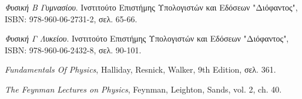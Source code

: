 \documentclass[12pt,titlepage]{article}
\begin{document}
\begin{thebibliography}{9}
 \textit{Φυσική Β Γυμνασίου}.
 Ινστιτούτο Επιστήμης Υπολογιστών και Εδόσεων "Διόφαντος", ISBN: 978-960-06-2731-2, σελ. 65-66.

 \textit{Φυσική Γ Λυκείου}.
 Ινστιτούτο Επιστήμης Υπολογιστών και Εδόσεων "Διόφαντος", ISBN: 978-960-06-2432-8, σελ. 90-101.

 \textit{Fundamentals Of Physics}, Halliday, Resnick, Walker, 9th Edition, σελ. 361.

 \textit{The Feynman Lectures on Physics}, Feynman, Leighton, Sands, vol. 2, ch. 40.

\end{thebibliography}
\end{document}
